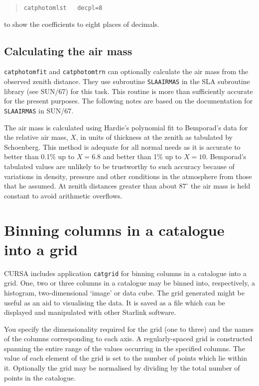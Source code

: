 \documentclass[twoside,11pt]{article}
\newcommand{\xref}[3]{#1}
\newcommand{\xlabel}[1]{}
\renewcommand{\_}{\texttt{\symbol{95}}}
\begin{document}
\begin{verse}
{\tt catphotomlst ~ decpl=8}
\end{verse}

to show the coefficients to eight places of decimals.

\subsection{\label{AIRMASS}Calculating the air mass}

{\tt catphotomfit} and {\tt catphotomtrn} can optionally calculate
the air mass from the observed zenith distance.  They use subroutine
{\tt SLA\_AIRMAS} in the SLA subroutine library (see
\xref{SUN/67}{sun67}{}\cite{SUN67}) for this task.  This routine is
more than sufficiently accurate for the present purposes.  The
following notes are based on the documentation for {\tt SLA\_AIRMAS}
in SUN/67.

The air mass is calculated using Hardie's\cite{HARDIE62} polynomial fit
to Bemporad's data for the relative air mass, $X$, in units of thickness
at the zenith as tabulated by Schoenberg\cite{SCHOEN29}.  This method
is adequate for all normal needs as it is accurate to better than 0.1\%
up to $X = 6.8$ and better than 1\% up to $X = 10$.  Bemporad's tabulated
values are unlikely to be trustworthy to such accuracy because of
variations in density, pressure and other conditions in the atmosphere
from those that he assumed.  At zenith distances greater than about
$87^{\circ}$ the air mass is held constant to avoid arithmetic overflows.


\section{\xlabel{GRIDS}\label{GRIDS}Binning columns in a catalogue into a
grid}

CURSA includes application {\tt catgrid} for binning columns in a
catalogue into a grid.  One, two or three columns in a catalogue may
be binned into, respectively, a histogram, two-dimensional `image' or
data cube.  The grid generated might be useful as an aid to visualising
the data.  It is saved as a file which can be displayed and manipulated
with other Starlink software.

You specify the dimensionality required for the grid (one to three)
and the names of the columns corresponding to each axis.  A
regularly-spaced grid is constructed spanning the entire range of the
values occurring in the specified columns.  The value of each element
of the grid is set to the number of points which lie within it.
Optionally the grid may be normalised by dividing by the total number of
points in the catalogue.
\end{document}
